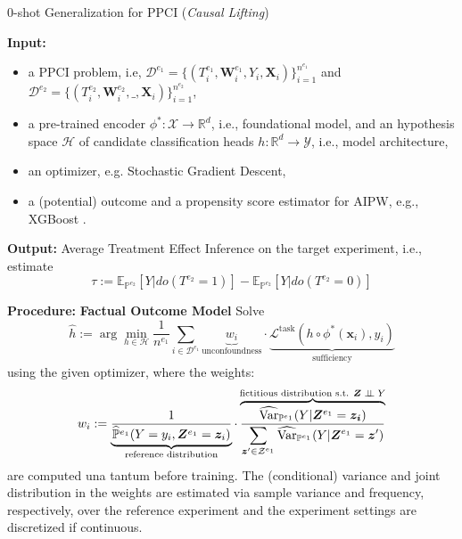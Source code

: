 \setcounter{algorithm}{0}
\begin{algorithm*}[h!]
\caption{0-shot Generalization for PPCI (\textit{Causal Lifting})}
\begin{algorithmic}[1] %
\label{alg:clfull}
    \STATE \textbf{Input:} 
    \begin{itemize}
    \setlength\itemsep{0em}
        \item a PPCI problem, i.e, $\mathcal{D}^{e_1}=\{(T^{e_1}_i, \bm{W}^{e_1}_i, Y_i, \bm{X}_i)\}_{i=1}^{n^{e_1}}$  and  $\mathcal{D}^{e_2}=\{(T^{e_2}_i, \bm{W}^{e_2}_i, \_, \bm{X}_i)\}_{i=1}^{n^{e_2}}$,
        \item a pre-trained encoder $\phi^*: \mathcal{X} \rightarrow\mathbb{R}^d$, i.e., foundational model, and an hypothesis space $\mathcal{H}$ of candidate classification heads $h:\mathbb{R}^d\rightarrow \mathcal{Y}$, i.e., model architecture,
        \item an optimizer, e.g. Stochastic Gradient Descent,
        \item a (potential) outcome and a propensity score estimator for AIPW, e.g., XGBoost \citep{chen2016xgboost}.
    \end{itemize}
    \medskip
    \STATE \textbf{Output:} Average Treatment Effect Inference on the target experiment, i.e., estimate
    \begin{equation}
        \tau:=\mathbb{E}_{\mathbb{P}^{e_2}}[Y|do(T^{e_2}=1)]-\mathbb{E}_{\mathbb{P}^{e_2}}[Y|do(T^{e_2}=0)]
    \end{equation}
    
    \bigskip
    \STATE \textbf{Procedure:} 
    \STATE \qquad \textbf{Factual Outcome Model}
    Solve
    \begin{equation}
        \hat{h}:=\arg \min_{h \in \mathcal{H}} \frac{1}{n^{e_1}}\sum_{i\in \mathcal{D}^{e_1}} \underbrace{w_i}_{\text{unconfoundness}}\cdot\underbrace{\mathcal{L}^{\text{task}}(h \circ \phi^*(\bm{x}_i), y_i)}_{\text{sufficiency}}
    \end{equation}
    using the given optimizer, where the weights:
    \begin{equation}
            w_i :=\underbrace{\frac{1}{\widehat{\mathbb{P}}^{e_1}(Y=y_i, \bm{Z}^{e_1}=\bm{z}_i)}}_{\text{reference distribution}} \cdot \overbrace{\frac{\widehat{\text{Var}}_{\mathbb{P}^{e_1}}(Y|\bm{Z}^{e_1}=\bm{z_i})}{\displaystyle\sum_{\bm{z}'\in \mathcal{Z}^{e_1}} \widehat{\text{Var}}_{\mathbb{P}^{e_1}}(Y|\bm{Z}^{e_1}=\bm{z}')}}^{\text{fictitious distribution s.t. $\bm{Z} \perp\!\!\!\perp Y$}}
        \end{equation}
    are computed una tantum before training. The (conditional) variance and joint distribution in the weights are estimated via sample variance and frequency, respectively, over the reference experiment and the experiment settings are discretized if continuous.


\end{algorithmic}
\end{algorithm*}
